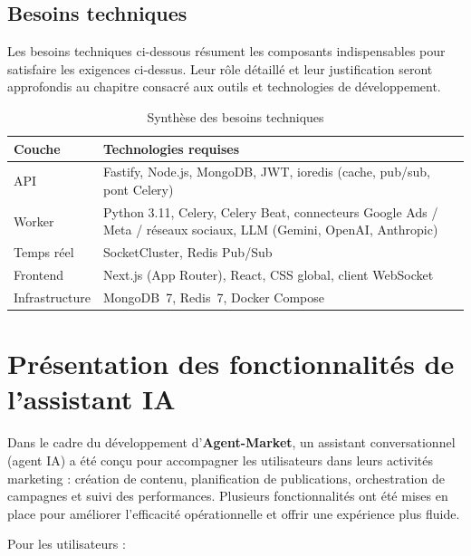 \documentclass[12pt,a4paper]{report}
\numberwithin{figure}{chapter}
\numberwithin{table}{chapter}
\begin{document}
\subsection{Besoins techniques}

Les besoins techniques ci-dessous résument les composants indispensables pour satisfaire les exigences ci-dessus. Leur rôle détaillé et leur justification seront approfondis au chapitre consacré aux outils et technologies de développement.

\begin{table}[H]
\centering
\caption{Synthèse des besoins techniques}
\label{tab:besoins_techniques}
\renewcommand{\arraystretch}{1.4}
\begin{tabular}{|p{}|p{}|}
\hline
\textbf{Couche} & \textbf{Technologies requises} \\
\hline
API & Fastify, Node.js, MongoDB, JWT, ioredis (cache, pub/sub, pont Celery) \\
\hline
Worker & Python 3.11, Celery, Celery Beat, connecteurs Google Ads / Meta / réseaux sociaux, LLM (Gemini, OpenAI, Anthropic) \\
\hline
Temps réel & SocketCluster, Redis Pub/Sub \\
\hline
Frontend & Next.js (App Router), React, CSS global, client WebSocket \\
\hline
Infrastructure & MongoDB~7, Redis~7, Docker Compose \\
\hline
\end{tabular}
\end{table}

\section{Présentation des fonctionnalités de l’assistant IA}

Dans le cadre du développement d’\textbf{Agent-Market}, un assistant conversationnel (agent IA) a été conçu pour accompagner les utilisateurs dans leurs activités marketing : création de contenu, planification de publications, orchestration de campagnes et suivi des performances. Plusieurs fonctionnalités ont été mises en place pour améliorer l’efficacité opérationnelle et offrir une expérience plus fluide.

Pour les utilisateurs :
\end{document}
